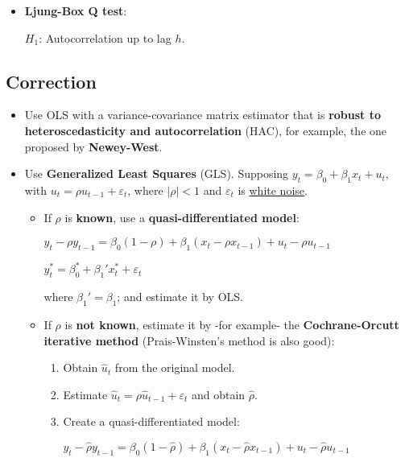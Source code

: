 \documentclass[10pt, a4paper, landscape]{article}
\begin{document}
\begin{multicols}{3}
\begin{itemize}[leftmargin=*]
	\item \textbf{Ljung-Box Q test}:

	\( H_{1} \): Autocorrelation up to lag \( h \).
\end{itemize}

\columnbreak

\subsection*{Correction}

\begin{itemize}[leftmargin=*]
	\item Use OLS with a variance-covariance matrix estimator that is \textbf{robust to heteroscedasticity and autocorrelation} (HAC), for example, the one proposed by \textbf{Newey-West}.
	\item Use \textbf{Generalized Least Squares} (GLS). Supposing \( y_{t} = \beta_{0} + \beta_{1} x_{t} + u_{t} \), with \( u_{t} = \rho u_{t - 1} + \varepsilon_{t} \), where \( \lvert \rho \rvert < 1 \) and \( \varepsilon_{t} \) is \underline{white noise}.
	\begin{itemize}[leftmargin=*]
		\item If \( \rho \) is \textbf{known}, use a \textbf{quasi-differentiated model}:
		\begin{center}
			\( y_{t} - \rho y_{t - 1}= \beta_{0} (1 - \rho) + \beta_{1} (x_{t} - \rho x_{t - 1}) + u_{t} - \rho u_{t - 1} \)

			\( y_{t}^{*} = \beta_{0}^{*} + \beta_{1}' x_{t}^{*} + \varepsilon_{t} \)
		\end{center}
		where \( \beta_{1}' = \beta_{1} \); and estimate it by OLS.
		\item If \( \rho \) is \textbf{not known}, estimate it by -for example- the \textbf{Cochrane-Orcutt iterative method} (Prais-Winsten's method is also good):
		\begin{enumerate}[leftmargin=*]
			\item Obtain \( \hat{u}_{t} \) from the original model.
			\item Estimate \( \hat{u}_{t} = \rho \hat{u}_{t - 1} + \varepsilon_{t} \) and obtain \( \hat{\rho} \).
			\item Create a quasi-differentiated model:
			\begin{center}
				\( y_{t} - \hat{\rho}y_{t - 1} = \beta_{0} (1 - \hat{\rho}) + \beta_{1} (x_{t} - \hat{\rho} x_{t - 1}) + u_{t} - \hat{\rho}u_{t - 1} \)


\end{center}
\end{enumerate}
\end{itemize}
\end{itemize}
\end{multicols}
\end{document}
